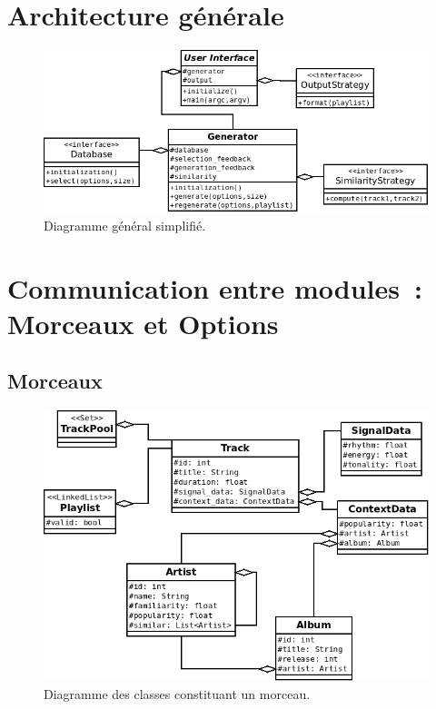 \section{Architecture générale}
\label{archi:general}

\begin{figure}[H]
\includegraphics[width=\textwidth]{data/archi/general.png}
\caption{Diagramme général simplifié.}
\end{figure}

\section{Communication entre modules~: Morceaux et Options}
\label{archi:communication}

\subsection{Morceaux}
\label{archi:communication:track}

\begin{figure}[H]
\includegraphics[width=\textwidth]{data/archi/track.png}
\caption{Diagramme des classes constituant un morceau.}
\end{figure}

